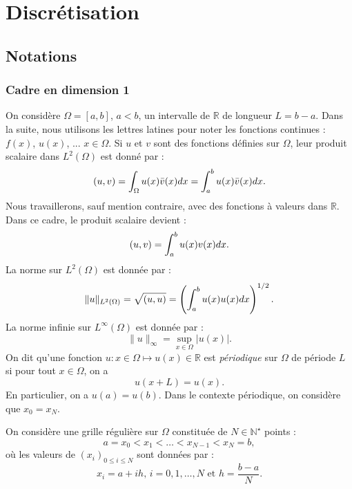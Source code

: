 
\chapter{Discrétisation}

\section{Notations}

\subsection{Cadre en dimension 1}
\label{sec:notation_1D}

On considère $\Omega = [a,b]$, $a<b$, un intervalle de $\mathbb{R}$ de longueur $L=b-a$. Dans la suite, nous utilisons les lettres latines pour noter les fonctions continues : $f(x)$, $u(x)$, ... $x \in \Omega$. Si $u$ et $v$ sont des fonctions définies sur $\Omega$, leur produit scalaire dans $L^2 ( \Omega )$ est donné par :
\begin{equation}
(u,v) = \displaystyle\int_{\Omega} u(x) \bar{v}(x) dx = \displaystyle\int_{a}^b u(x) \bar{v}(x) dx.
\end{equation}
Nous travaillerons, sauf mention contraire, avec des fonctions à valeurs dans $\mathbb{R}$. Dans ce cadre, le produit scalaire devient :
\begin{equation}
(u,v) = \displaystyle\int_{a}^b u(x) v(x) dx.
\end{equation}
La norme sur $L^2(\Omega)$ est donnée par :
\begin{equation}
\| u \|_{L^2(\Omega)} = \sqrt{(u,u)} = \left( \displaystyle\int_{a}^b u(x) u(x) dx \right)^{1/2}.
\end{equation}
La norme infinie sur $L^{\infty}(\Omega)$ est donnée par :
\begin{equation}
\| u \|_{\infty} = \sup_{x\in\Omega} |u(x)|.
\end{equation}
On dit qu'une fonction $u : x \in \Omega \mapsto u(x) \in \mathbb{R}$ est \textit{périodique} sur $\Omega$ de période $L$ si pour tout $x \in \Omega$, on a 
\begin{equation}
u(x+L) = u(x).
\end{equation}
En particulier, on a $u(a)=u(b)$. Dans le contexte périodique, on considère que $x_0 = x_N$.

On considère une grille régulière sur $\Omega$ constituée de $N \in \mathbb{N}^{\star}$ points :
\begin{equation}
a=x_0 < x_1 < \ldots < x_{N-1} < x_N = b,
\end{equation}
où les valeurs de $(x_i)_{0\leq i \leq N}$ sont données par :
\begin{equation}
x_i = a + ih\text{, } i = 0,1, \ldots,N \text{ et } h = \dfrac{b-a}{N}. 
\end{equation}

